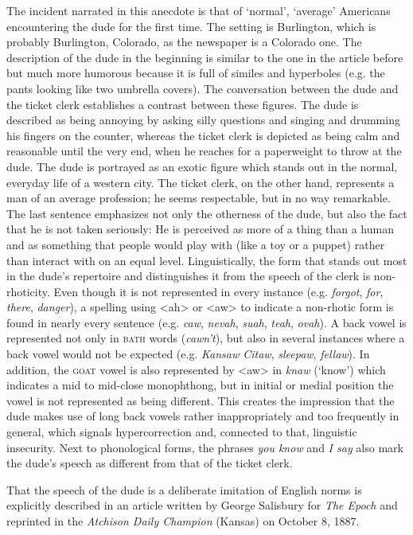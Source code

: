 The incident narrated in this anecdote is that of ‘normal’, ‘average’ Americans encountering the dude for the first time. The setting is Burlington, which is probably Burlington, Colorado, as the newspaper is a Colorado one. The description of the dude in the beginning is similar to the one in the article before but much more humorous because it is full of similes and hyperboles (e.g. the pants looking like two umbrella covers). The conversation between the dude and the ticket clerk establishes a contrast between these figures. The dude is described as being annoying by asking silly questions and singing and drumming his fingers on the counter, whereas the ticket clerk is depicted as being calm and reasonable until the very end, when he reaches for a paperweight to throw at the dude. The dude is portrayed as an exotic figure which stands out in the normal, everyday life of a western city. The ticket clerk, on the other hand, represents a man of an average profession; he seems respectable, but in no way remarkable. The last sentence emphasizes not only the otherness of the dude, but also the fact that he is not taken seriously: He is perceived as more of a thing than a human and as something that people would play with (like a toy or a puppet) rather than interact with on an equal level. Linguistically, the form that stands out most in the dude’s repertoire and distinguishes it from the speech of the clerk is non-rhoticity. Even though it is not represented in every instance (e.g. \emph{forgot}, \emph{for}, \emph{there}, \emph{danger}), a spelling using <ah> or <aw> to indicate a non-rhotic form is found in nearly every sentence (e.g. \emph{caw}, \emph{nevah}, \emph{suah}, \emph{teah},\emph{ ovah}). A back vowel is represented not only in \textsc{bath} words (\emph{cawn’t}), but also in several instances where a back vowel would not be expected (e.g. \emph{Kansaw Citaw},\emph{ sleepaw},\emph{ fellaw}). In addition, the \textsc{goat} vowel is also represented by <aw> in \emph{knaw} (‘know’) which indicates a mid to mid-close monophthong, but in initial or medial position the vowel is not represented as being different. This creates the impression that the dude makes use of long back vowels rather inappropriately and too frequently in general, which signals hypercorrection and, connected to that, linguistic insecurity. Next to phonological forms, the phrases \emph{you know} and \emph{I say} also mark the dude’s speech as different from that of the ticket clerk.


That the speech of the dude is a deliberate imitation of English norms is explicitly described in an article written by George Salisbury for \emph{The Epoch} and reprinted in the \emph{Atchison Daily Champion} (Kansas) on October 8, 1887.

